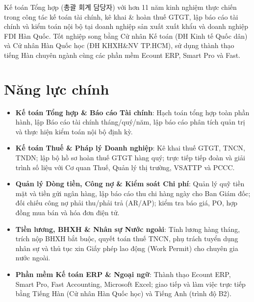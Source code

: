 \documentclass[11pt,a4paper,sans]{moderncv}
\begin{document}
\makecvtitle


\vspace{6pt}
\small{Kế toán Tổng hợp (총괄 회계 담당자) với hơn 11 năm kinh nghiệm thực chiến trong công tác kế toán tài chính, kê khai \& hoàn thuế GTGT, lập báo cáo tài chính và kiểm toán nội bộ tại doanh nghiệp sản xuất xuất khẩu và doanh nghiệp FDI Hàn Quốc. Tốt nghiệp song bằng Cử nhân Kế toán (ĐH Kinh tế Quốc dân) và Cử nhân Hàn Quốc học (ĐH KHXH\&NV TP.HCM), sử dụng thành thạo tiếng Hàn chuyên ngành cùng các phần mềm Ecount ERP, Smart Pro và Fast.}


\section{Năng lực chính}
\vspace{1pt}
\begin{itemize}

\item \textbf{Kế toán Tổng hợp \& Báo cáo Tài chính}: Hạch toán tổng hợp toàn phần hành, lập Báo cáo tài chính tháng/quý/năm, lập báo cáo phân tích quản trị và thực hiện kiểm toán nội bộ định kỳ.

\item \textbf{Kế toán Thuế \& Pháp lý Doanh nghiệp}: Kê khai thuế GTGT, TNCN, TNDN; lập bộ hồ sơ hoàn thuế GTGT hàng quý; trực tiếp tiếp đoàn và giải trình số liệu với Cơ quan Thuế, Quản lý thị trường, VSATTP và PCCC.

\item \textbf{Quản lý Dòng tiền, Công nợ \& Kiểm soát Chi phí}: Quản lý quỹ tiền mặt và tiền gửi ngân hàng, lập báo cáo thu chi hàng ngày cho Ban Giám đốc; đối chiếu công nợ phải thu/phải trả (AR/AP); kiểm tra báo giá, PO, hợp đồng mua bán và hóa đơn điện tử.

\item \textbf{Tiền lương, BHXH \& Nhân sự Nước ngoài}: Tính lương hàng tháng, trích nộp BHXH bắt buộc, quyết toán thuế TNCN, phụ trách tuyển dụng nhân sự và thủ tục xin Giấy phép lao động (Work Permit) cho chuyên gia nước ngoài.

\item \textbf{Phần mềm Kế toán ERP \& Ngoại ngữ}: Thành thạo Ecount ERP, Smart Pro, Fast Accounting, Microsoft Excel; giao tiếp và làm việc trực tiếp bằng Tiếng Hàn (Cử nhân Hàn Quốc học) và Tiếng Anh (trình độ B2).

\end{itemize}
\end{document}

